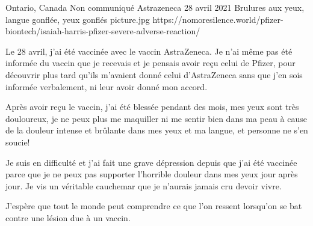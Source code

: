           {Ontario, Canada}
          {Non communiqué}
          {Astrazeneca}
          {28 avril 2021}
          {Brulures aux yeux, langue gonflée, yeux gonflés}
          {picture.jpg}
          {https://nomoresilence.world/pfizer-biontech/isaiah-harris-pfizer-severe-adverse-reaction/}
          {

Le 28 avril, j'ai été vaccinée avec le vaccin AstraZeneca. Je n'ai même pas été
informée du vaccin que je recevais et je pensais avoir reçu celui de Pfizer,
pour découvrir plus tard qu'ils m'avaient donné celui d'AstraZeneca sans que
j'en sois informée verbalement, ni leur avoir donné mon accord.

Après avoir reçu le vaccin, j'ai été blessée pendant des mois, mes yeux sont
très douloureux, je ne peux plus me maquiller ni me sentir bien dans ma peau à
cause de la douleur intense et brûlante dans mes yeux et ma langue, et personne
ne s'en soucie!

Je suis en difficulté et j'ai fait une grave dépression depuis que j'ai été
vaccinée parce que je ne peux pas supporter l'horrible douleur dans mes yeux
jour après jour. Je vis un véritable cauchemar que je n'aurais jamais cru devoir
vivre.

J'espère que tout le monde peut comprendre ce que l'on ressent lorsqu'on se bat
contre une lésion due à un vaccin.

}
